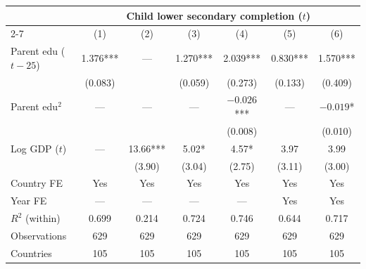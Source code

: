 \documentclass[12pt,letterpaper]{article}
\begin{document}
{\small\setlength{\tabcolsep}{4pt}
\begin{longtable}[]{@{}lcccccc@{}}
\toprule
 & \multicolumn{6}{c}{Child lower secondary completion ($t$)} \\
\cmidrule(lr){2-7}
 & (1) & (2) & (3) & (4) & (5) & (6) \\
\midrule
\endhead
Parent edu ($t-25$)   & 1.376*** & ---       & 1.270*** & 2.039*** & 0.830*** & 1.570*** \\
                      & (0.083)  &           & (0.059)  & (0.273)  & (0.133)  & (0.409)  \\
Parent edu$^2$        &   ---    &   ---     &   ---    & $-0.026$*** &   ---    & $-0.019$*    \\
                      &          &           &          & (0.008)  &          & (0.010)  \\
Log GDP ($t$)         &   ---    & 13.66***  & 5.02*    & 4.57*    & 3.97     & 3.99     \\
                      &          & (3.90)    & (3.04)   & (2.75)   & (3.11)   & (3.00)   \\
\midrule
Country FE            & Yes      & Yes       & Yes      & Yes      & Yes      & Yes      \\
Year FE               & ---      & ---       & ---      & ---      & Yes      & Yes      \\
$R^2$ (within)        & 0.699    & 0.214     & 0.724    & 0.746    & 0.644    & 0.717    \\
Observations          & 629      & 629       & 629      & 629      & 629      & 629      \\
Countries             & 105      & 105       & 105      & 105      & 105      & 105      \\
\bottomrule
\end{longtable}}
\end{document}
